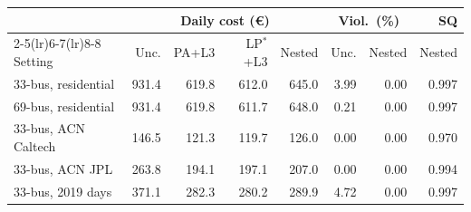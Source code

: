 \begin{tabular}{@{}lrrrrrrr@{}}
\toprule
 & \multicolumn{4}{c}{Daily cost (\euro)} & \multicolumn{2}{c}{Viol.\ (\%)} & SQ \\
\cmidrule(lr){2-5}\cmidrule(lr){6-7}\cmidrule(lr){8-8}
Setting & Unc. & PA+L3 & LP$^\ast$+L3 & Nested & Unc. & Nested & Nested \\
\midrule
33-bus, residential & 931.4 & 619.8 & 612.0 & 645.0 & 3.99 & 0.00 & 0.997 \\
69-bus, residential & 931.4 & 619.8 & 611.7 & 648.0 & 0.21 & 0.00 & 0.997 \\
33-bus, ACN Caltech & 146.5 & 121.3 & 119.7 & 126.0 & 0.00 & 0.00 & 0.970 \\
33-bus, ACN JPL & 263.8 & 194.1 & 197.1 & 207.0 & 0.00 & 0.00 & 0.994 \\
33-bus, 2019 days & 371.1 & 282.3 & 280.2 & 289.9 & 4.72 & 0.00 & 0.997 \\
\bottomrule
\end{tabular}
